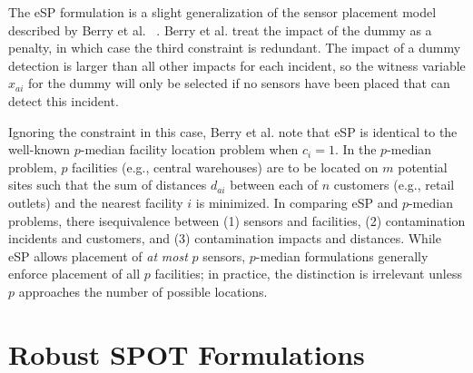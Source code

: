 The eSP formulation is a slight generalization of the sensor placement model described by Berry et al. ~\cite{BerHarPhiUbeWat06}. Berry et al. treat the impact of the dummy as a penalty, in which case the third constraint is redundant. The impact of a dummy detection is larger than all other impacts for each incident, so the witness variable $x_{ai}$ for the dummy will only be selected if no sensors have been placed that can detect this incident.

Ignoring the constraint in this case, Berry et al. note that eSP is identical to the well-\/known $p$-\/median facility location problem \citep{MirFra90} when $c_i=1$. In the $p$-\/median problem, $p$ facilities (e.g., central warehouses) are to be located on $m$ potential sites such that the sum of distances $d_{ai}$ between each of $n$ customers (e.g., retail outlets) and the nearest facility $i$ is minimized. In comparing eSP and $p$-\/median problems, there isequivalence between (1) sensors and facilities, (2) contamination incidents and customers, and (3) contamination impacts and distances. While eSP allows placement of {\itshape at\/} {\itshape most\/} $p$ sensors, $p$-\/median formulations generally enforce placement of all $p$ facilities; in practice, the distinction is irrelevant unless $p$ approaches the number of possible locations.

\section{Robust SPOT Formulations}\label{formulations_formulationsRobust}

